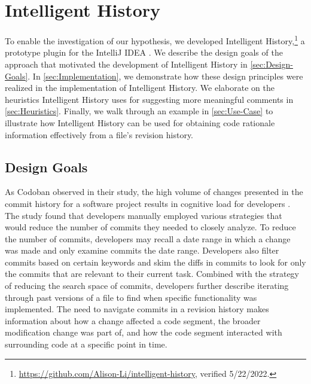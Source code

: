 \chapter{Intelligent History}
\label{ch:Intelligent-History}

To enable the investigation of our hypothesis, we developed Intelligent History,\footnote{\url{https://github.com/Alison-Li/intelligent-history}, verified 5/22/2022.} 
a prototype plugin for the IntelliJ IDEA .
We describe the design goals of the approach that motivated the development of Intelligent History in \autoref{sec:Design-Goals}. 
In \autoref{sec:Implementation}, we demonstrate how these design principles were realized in the implementation of Intelligent History. 
We elaborate on the heuristics Intelligent History uses for suggesting more meaningful comments in \autoref{sec:Heuristics}.
Finally, we walk through an example in \autoref{sec:Use-Case} to illustrate how Intelligent History can be used for obtaining code rationale information effectively from a file's revision history.

\section{Design Goals}
\label{sec:Design-Goals}

As Codoban \etal observed in their study, the high volume of changes presented in the commit history 
for a software project results in cognitive load for developers \cite{codoban_software_2015}.
The study found that developers manually employed various strategies that would 
reduce the number of commits they needed to closely analyze.
To reduce the number of commits, developers may recall a date range in which 
a change was made and only examine commits  the date range.
Developers also filter commits based on certain keywords and skim the diffs 
in commits to look for only the commits that are relevant to their current task.
Combined with the strategy of reducing the search space of commits, 
developers further describe iterating through past versions of a file to find when specific functionality was implemented.
The need to navigate  commits in a revision history 
makes  information about how a change affected a code segment, 
 the broader modification  change was part of, 
and  how the code segment interacted with surrounding code at a specific point in time.


